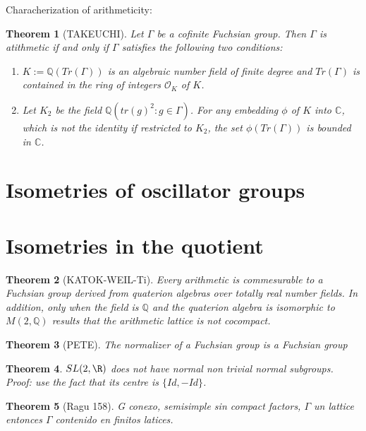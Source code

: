 \documentclass[11pt]{amsart}
\theoremstyle{plain}
\newtheorem{thm}{Theorem}[section]
\theoremstyle{definition}
\theoremstyle{remark}
\begin{document}
Characherization of arithmeticity:
\begin{thm} [TAKEUCHI]

Let $\Gamma$ be a cofinite Fuchsian group. Then $\Gamma$ is atithmetic if and only if $\Gamma$ satisfies the following two conditions:
\begin{enumerate}[label=(\roman*)]
\item $K:=\mathbb{Q}(Tr(\Gamma))$ is an algebraic number field of finite degree and $Tr(\Gamma)$ is contained in the ring of integers $\mathcal{O}_K$ of $K$.
\item Let $K_2$ be the field $\mathbb{Q}(tr(g)^2 : g \in \Gamma)$. For any embedding $\phi$ of $K$ into $\mathbb{C}$, which is not the identity if restricted to $K_2$, the set $\phi(Tr(\Gamma))$ is bounded in $\mathbb{C}$.
\end{enumerate}
\end{thm}


\section{Isometries of oscillator groups}

\section{Isometries in the quotient}

\begin{thm} [KATOK-WEIL-Ti]
Every arithmetic is commesurable to a Fuchsian group derived from quaterion algebras over totally real number fields. In addition, only when the field is $\mathbb{Q}$ and the quaterion algebra is isomorphic to $M(2,\mathbb{Q})$ results that the arithmetic lattice is not cocompact.
\end{thm}

\begin{thm} [PETE]
The normalizer of a Fuchsian group is a Fuchsian group
\end{thm}

\begin{thm}
$SL(2,\R)$ does not have normal non trivial normal subgroups. Proof: use the fact that its centre is $ \{Id,-Id \}$.
\end{thm}

\begin{thm} [Ragu 158]
G conexo, semisimple sin compact factors, $\Gamma$ un lattice entonces $\Gamma$ contenido en finitos latices.
\end{thm}
\end{document}

